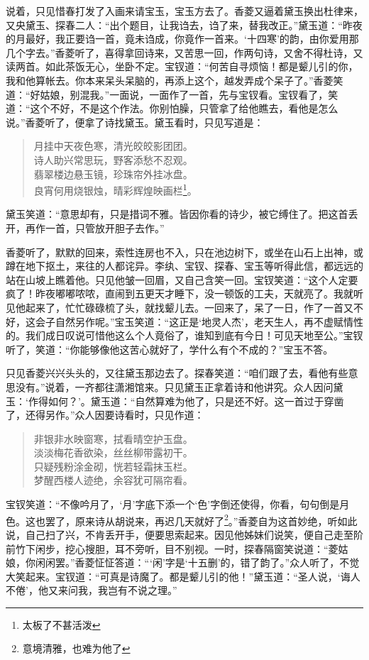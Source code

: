 \documentclass[12pt,oneside]{book}
\newenvironment{shici}{%
\begin{verse}%
\centering\large\hspace{12pt}}%
{\end{verse}}
\begin{document}
说着，只见惜春打发了入画来请宝玉，宝玉方去了。香菱又逼着黛玉换出杜律来，又央黛玉、探春二人：“出个题目，让我诌去，诌了来，替我改正。”黛玉道：“昨夜的月最好，我正要诌一首，竟未诌成，你竟作一首来。‘十四寒’的韵，由你爱用那几个字去。”香菱听了，喜得拿回诗来，又苦思一回，作两句诗，又舍不得杜诗，又读两首。如此茶饭无心，坐卧不定。宝钗道：“何苦自寻烦恼！都是颦儿引的你，我和他算帐去。你本来呆头呆脑的，再添上这个，越发弄成个呆子了。”香菱笑道：“好姑娘，别混我。”一面说，一面作了一首，先与宝钗看。宝钗看了，笑道：“这个不好，不是这个作法。你别怕臊，只管拿了给他瞧去，看他是怎么说。”香菱听了，便拿了诗找黛玉。黛玉看时，只见写道是：

\begin{shici}
月挂中天夜色寒，清光皎皎影团团。\\
诗人助兴常思玩，野客添愁不忍观。\\
翡翠楼边悬玉镜，珍珠帘外挂冰盘。\\
良宵何用烧银烛，晴彩辉煌映画栏\footnote{太板了不甚活泼}。
\end{shici}

黛玉笑道：“意思却有，只是措词不雅。皆因你看的诗少，被它缚住了。把这首丢开，再作一首，只管放开胆子去作。”

香菱听了，默默的回来，索性连房也不入，只在池边树下，或坐在山石上出神，或蹲在地下抠土，来往的人都诧异。李纨、宝钗、探春、宝玉等听得此信，都远远的站在山坡上瞧着他。只见他皱一回眉，又自己含笑一回。宝钗笑道：“这个人定要疯了！昨夜嘟嘟哝哝，直闹到五更天才睡下，没一顿饭的工夫，天就亮了。我就听见他起来了，忙忙碌碌梳了头，就找颦儿去。一回来了，呆了一日，作了一首又不好，这会子自然另作呢。”宝玉笑道：“这正是‘地灵人杰’，老天生人，再不虚赋情性的。我们成日叹说可惜他这么个人竟俗了，谁知到底有今日！可见天地至公。”宝钗听了，笑道：“你能够像他这苦心就好了，学什么有个不成的？”宝玉不答。

只见香菱兴兴头头的，又往黛玉那边去了。探春笑道：“咱们跟了去，看他有些意思没有。”说着，一齐都往潇湘馆来。只见黛玉正拿着诗和他讲究。众人因问黛玉：‘作得如何？’。黛玉道：“自然算难为他了，只是还不好。这一首过于穿凿了，还得另作。”众人因要诗看时，只见作道：

\begin{shici}
非银非水映窗寒，拭看晴空护玉盘。\\
淡淡梅花香欲染，丝丝柳带露初干。\\
只疑残粉涂金砌，恍若轻霜抹玉栏。\\
梦醒西楼人迹绝，余容犹可隔帘看。
\end{shici}



宝钗笑道：“不像吟月了，‘月’字底下添一个‘色’字倒还使得，你看，句句倒是月色。这也罢了，原来诗从胡说来，再迟几天就好了\footnote{意境清雅，也难为他了}。”香菱自为这首妙绝，听如此说，自己扫了兴，不肯丢开手，便要思索起来。因见他姊妹们说笑，便自己走至阶前竹下闲步，挖心搜胆，耳不旁听，目不别视。一时，探春隔窗笑说道：“菱姑娘，你闲闲罢。”香菱怔怔答道：“‘闲’字是‘十五删’的，错了韵了。”众人听了，不觉大笑起来。宝钗道：“可真是诗魔了。都是颦儿引的他！”黛玉道：“圣人说，‘诲人不倦’，他又来问我，我岂有不说之理。”
\end{document}
